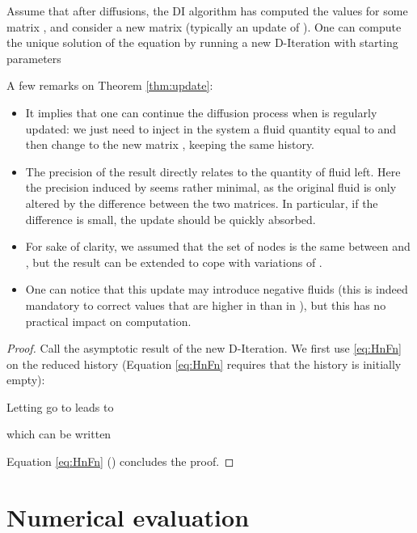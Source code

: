 \documentclass{llncs}
\begin{document}
\begin{theorem}
Assume that after  diffusions, the DI algorithm has computed the values  for some matrix , and consider a new matrix  (typically an update of ). One can compute the unique solution of the equation  by running a new D-Iteration with starting parameters

\label{thm:update}
\end{theorem}

A few remarks on Theorem \ref{thm:update}:
\begin{itemize}
\item It implies that one can continue the diffusion process when  is regularly updated: we just need to inject in the system a fluid quantity equal to  and then change to the new matrix , keeping the same history. \item The precision of the result directly relates to the quantity of fluid left. Here the precision induced by  seems rather minimal, as the original fluid is only altered by the difference between the two matrices. In particular, if the difference  is small, the update should be quickly absorbed.
\item For sake of clarity, we assumed that the set of nodes is the same between  and , but the result can be extended to cope with variations of .
\item One can notice that this update may introduce negative fluids (this is indeed mandatory to correct values that are higher in  than in ), but this has no practical impact on computation.
\end{itemize}

\begin{proof}
Call  the asymptotic result of the new D-Iteration. We first use \eqref{eq:HnFn} on the reduced history  (Equation \eqref{eq:HnFn} requires that the history is initially empty):


Letting  go to  leads to 

which can be written



Equation \eqref{eq:HnFn} () concludes the proof.

\end{proof}








\section{Numerical evaluation}
\end{document}
